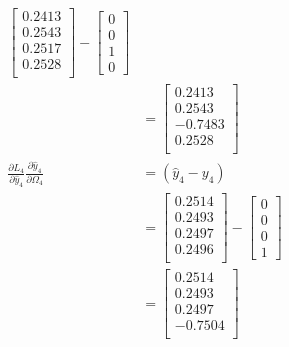 \documentclass{article}
\begin{document}
\begin{align*}
\begin{bmatrix}
  0.2413 \\
  0.2543 \\
 0.2517 \\
 0.2528 \\
\end{bmatrix} - \begin{bmatrix} 0 \\ 0 \\ 1 \\ 0 \end{bmatrix}\\
&= \begin{bmatrix}
  0.2413 \\
  0.2543\\
 -0.7483 \\
 0.2528 \\
\end{bmatrix}\\
\frac{\partial L_4}{\partial \hat{y}_4}\frac{\partial \hat{y}_4}{\partial \Omega_4} &= (\hat{y}_{4}-y_{4})\\
&=\begin{bmatrix}
  0.2514 \\
 0.2493 \\
 0.2497 \\
 0.2496 \\
\end{bmatrix}-\begin{bmatrix} 0 \\ 0 \\ 0 \\ 1 \end{bmatrix} \\
&= \begin{bmatrix}
  0.2514 \\
 0.2493 \\
 0.2497 \\
 -0.7504 \\
\end{bmatrix}
\end{align*}
\end{document}

